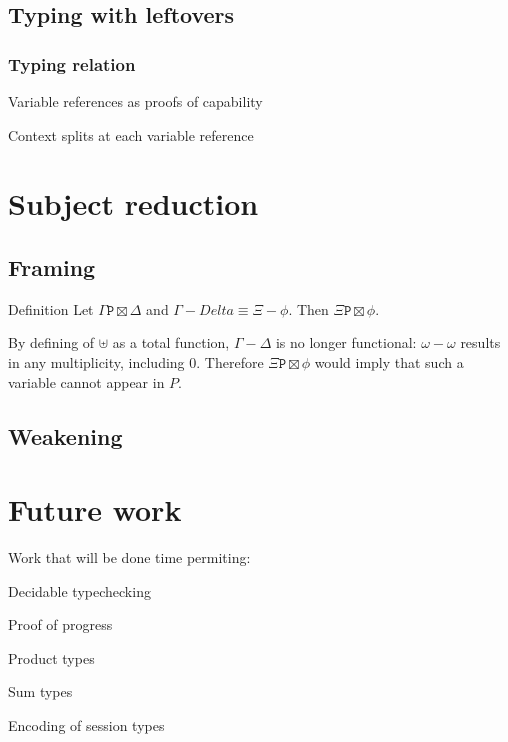 \documentclass[a4paper,UKenglish,cleveref, autoref, thm-restate,authorcolumns]{lipics-v2019}
\newcommand{\type}{\texttt}
\begin{document}
\subsection{Typing with leftovers}

\subsubsection{Typing relation}

Variable references as proofs of capability

Context splits at each variable reference

\section{Subject reduction}

\subsection{Framing}

Definition
Let $\Gamma \type P \boxtimes \Delta$ and $\Gamma - Delta \equiv \Xi - \phi$.
Then $\Xi \type P \boxtimes \phi$.

By defining of $\uplus$ as a total function, $\Gamma - \Delta$ is no longer
functional: $\omega - \omega$ results in any multiplicity, including $0$. Therefore
$\Xi \type P \boxtimes \phi$ would imply that such a variable cannot appear in $P$.

\subsection{Weakening}

\section{Future work}

Work that will be done time permiting:

Decidable typechecking

Proof of progress

Product types

Sum types

Encoding of session types



\end{document}
